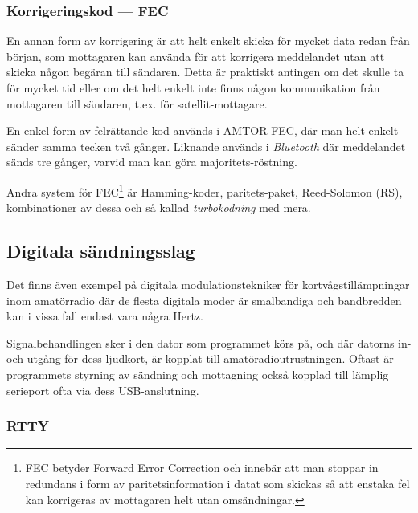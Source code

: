 \subsubsection{Korrigeringskod --- FEC}

En annan form av korrigering är att helt enkelt skicka för mycket data redan
från början, som mottagaren kan använda för att korrigera meddelandet utan att
skicka någon begäran till sändaren. Detta är praktiskt antingen om det skulle
ta för mycket tid eller om det helt enkelt inte finns någon kommunikation från
mottagaren till sändaren, t.ex. för satellit-mottagare.

En enkel form av felrättande kod används i AMTOR FEC, där man helt enkelt
sänder samma tecken två gånger. Liknande används i \emph{Bluetooth} där 
meddelandet sänds tre gånger, varvid man kan göra majoritets-röstning.

Andra system för FEC\footnote{FEC betyder Forward Error Correction och innebär att man stoppar in redundans i form av paritetsinformation i datat som skickas så att enstaka fel kan korrigeras av mottagaren helt utan omsändningar.} är Hamming-koder, paritets-paket, Reed-Solomon (RS), kombinationer av dessa och så kallad \emph{turbokodning} med mera.

\subsection{Digitala sändningsslag}

Det finns även exempel på digitala modulationstekniker för 
kortvågstillämpningar inom amatörradio där de flesta digitala 
moder är smalbandiga och bandbredden kan i vissa
fall endast vara några Hertz.

Signalbehandlingen sker i den dator som programmet körs på, och där datorns
in- och utgång för dess ljudkort, är kopplat till amatöradioutrustningen.
Oftast är programmets styrning av sändning och mottagning också kopplad till
lämplig serieport ofta via dess USB-anslutning.

\subsubsection{RTTY}

